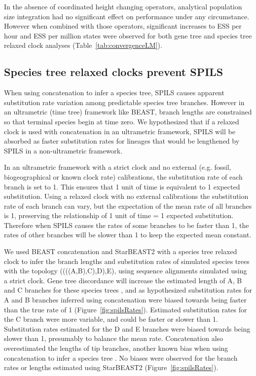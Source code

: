 \documentclass[nogrid]{MBE}%
\begin{document}
In the absence of coordinated height changing operators, analytical population
size integration had no significant effect on performance under any
circumstance. However when combined with those operators, significant increases
to ESS per hour and ESS per million states were observed for both gene tree and
species tree relaxed clock analyses (Table~\ref{tab:convergenceLM}).

\subsection{Species tree relaxed clocks prevent SPILS}

When using concatenation to infer a species tree, SPILS causes apparent
substitution rate variation among predictable species tree branches. However in
an ultrametric (time tree) framework like BEAST, branch lengths are constrained so that
terminal species begin at time zero. We hypothesized that if a relaxed clock is
used with concatenation in an ultrametric framework, SPILS will be absorbed as
faster substitution rates for lineages that would be lengthened by SPILS in a
non-ultrametric framework.

In an ultrametric framework with a strict clock and no external (e.g. fossil,
biogeographical or known clock rate)
calibrations, the substitution rate of each branch is set to 1. This ensures that 1 unit of time
is equivalent to 1 expected substitution. Using a relaxed clock with no external calibrations
the substitution rate of each branch can vary, but the expectation of the mean rate of all
branches is 1, preserving the relationship of 1 unit of time = 1 expected substitution.
Therefore when SPILS causes the rates of some branches to be faster than 1,
the rates of other branches will be slower than 1 to keep the expected mean constant.

We used BEAST concatenation and StarBEAST2 with a species tree relaxed clock to
infer the branch lengths and substitution rates of simulated species trees with
the topology ((((A,B),C),D),E), using sequence alignments simulated using a strict
clock. Gene tree discordance will increase the estimated length of A, B and C
branches for these species trees \citep{Mendes01072016}, and as hypothesized
substitution rates for A and B branches inferred using concatenation were biased
towards being faster than the true rate of 1 (Figure~\ref{fig:spilsRates}).
Estimated substitution rates for the C branch were more variable, and could be
faster or slower than 1. Substitution rates estimated for the D and E branches
were biased towards being slower than 1, presumably to balance the mean rate. Concatenation also overestimated the lengths of tip branches, another known
bias when using concatenation to infer a species tree \citep{Ogilvie01052016}. No biases were observed for the branch rates or lengths estimated using StarBEAST2
(Figure~\ref{fig:spilsRates}).
\end{document}
